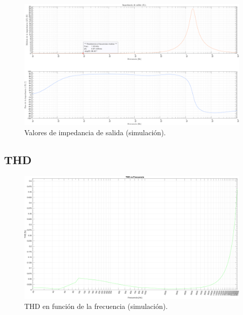 \clearpage

\begin{figure}[H]
    \centering
    \includegraphics[height=0.66 \textwidth, angle=90]{./img/simulaciones/Impedance/amplifier_Zo.png}
    \caption{Valores de impedancia de salida (simulación).}
    \label{fig:amplifier_Zo_sim}
\end{figure}

\clearpage

\subsection{THD}

\begin{figure}[H]
    \centering
    \includegraphics[height=0.66 \textwidth, angle=90]{./img/simulaciones/THD/THD_vs_frequency_sim.png}
    \caption{THD en función de la frecuencia (simulación).}
    \label{fig:THD_vs_frequency_sim}
\end{figure}

